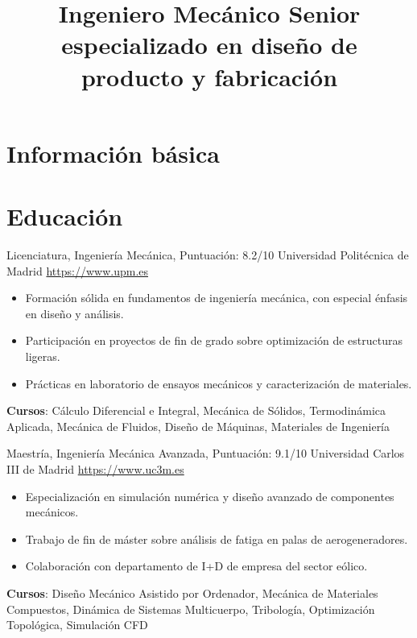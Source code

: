 \documentclass[a4paper, serif, 10pt]{moderncv}
\title{Ingeniero Mecánico Senior especializado en diseño de producto y fabricación}
\begin{document}
\maketitle

\section{Información básica}

\section{Educación}

        {Licenciatura, Ingeniería Mecánica, Puntuación: 8.2/10}
        {Universidad Politécnica de Madrid}
        {\url{https://www.upm.es}}
        {}
        {\begin{itemize}
\item Formación sólida en fundamentos de ingeniería mecánica, con especial énfasis en diseño y análisis.
\item Participación en proyectos de fin de grado sobre optimización de estructuras ligeras.
\item Prácticas en laboratorio de ensayos mecánicos y caracterización de materiales.
\end{itemize}
\textbf{Cursos}: Cálculo Diferencial e Integral, Mecánica de Sólidos, Termodinámica Aplicada, Mecánica de Fluidos, Diseño de Máquinas, Materiales de Ingeniería}

        {Maestría, Ingeniería Mecánica Avanzada, Puntuación: 9.1/10}
        {Universidad Carlos III de Madrid}
        {\url{https://www.uc3m.es}}
        {}
        {\begin{itemize}
\item Especialización en simulación numérica y diseño avanzado de componentes mecánicos.
\item Trabajo de fin de máster sobre análisis de fatiga en palas de aerogeneradores.
\item Colaboración con departamento de I+D de empresa del sector eólico.
\end{itemize}
\textbf{Cursos}: Diseño Mecánico Asistido por Ordenador, Mecánica de Materiales Compuestos, Dinámica de Sistemas Multicuerpo, Tribología, Optimización Topológica, Simulación CFD}
\end{document}
